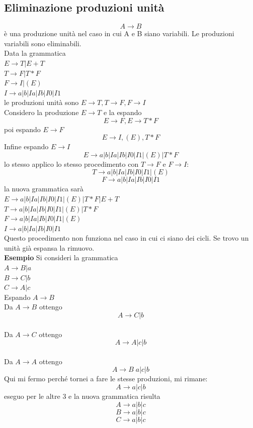 \documentclass[12pt]{article}
\begin{document}
\subsection{Eliminazione produzioni unità}
\[A \rightarrow B \]
è una produzione unità nel caso in cui A e B siano variabili. Le produzioni variabili sono eliminabili.
\\ Data la grammatica 
\\ $ E \rightarrow T | E + T$
\\ $ T \rightarrow F | T * F$
\\ $ F \rightarrow I | (E) $
\\ $ I \rightarrow a | b | Ia | Ib | I0 | I1 $
\\ le produzioni unità sono $E \rightarrow T, T \rightarrow F, F \rightarrow I$ 
\\ Considero la produzione $E \rightarrow T$ e la espando 
\[ E \rightarrow F, E \rightarrow T * F \]
poi espando $E \rightarrow F$
\[ E \rightarrow I, (E), T * F \]
Infine espando $E \rightarrow I$
\[ E \rightarrow a | b| Ia |Ib|I0|I1|(E)|T*F\]
lo stesso applico lo stesso procedimento con $T \rightarrow F$ e $F \rightarrow I$: 
\[ T \rightarrow a | b| Ia |Ib|I0|I1|(E)\]
\[ F \rightarrow a | b| Ia |Ib|I0|I1\]
la nuova grammatica sarà 
\\ $ E \rightarrow a | b | Ia | Ib | I0 | I1  | (E) | T*F | E+T $
\\ $ T \rightarrow a | b | Ia | Ib | I0 | I1  | (E) | T * F$
\\ $ F \rightarrow a | b | Ia | Ib | I0 | I1  | (E) $
\\ $ I \rightarrow a | b | Ia | Ib | I0 | I1  $
\\ Questo procedimento non funziona nel caso in cui ci siano dei cicli. Se trovo un unità già espansa la rimuovo.
\vspace{2mm}
\\ \textbf{Esempio} Si consideri la grammatica
\\ $ A \rightarrow B | a$
\\ $ B \rightarrow C | b$
\\ $ C \rightarrow A | c$
\\ Espando $ A \rightarrow B$
\\ Da $ A \rightarrow B $ ottengo 
\[ A \rightarrow C | b \]
\\ Da $ A \rightarrow C $ ottengo 
\[ A \rightarrow A | c | b \]
\\ Da $ A \rightarrow A $ ottengo 
\[ A \rightarrow B \; a | c | b \]
Qui mi fermo perché tornei a fare le stesse produzioni, mi rimane:
\[ A \rightarrow a | c | b \]
eseguo per le altre 3 e la nuova grammatica risulta 
\[ A \rightarrow a | b | c \]
\[ B \rightarrow a | b | c \]
\[ C \rightarrow a | b | c \]
\end{document}
